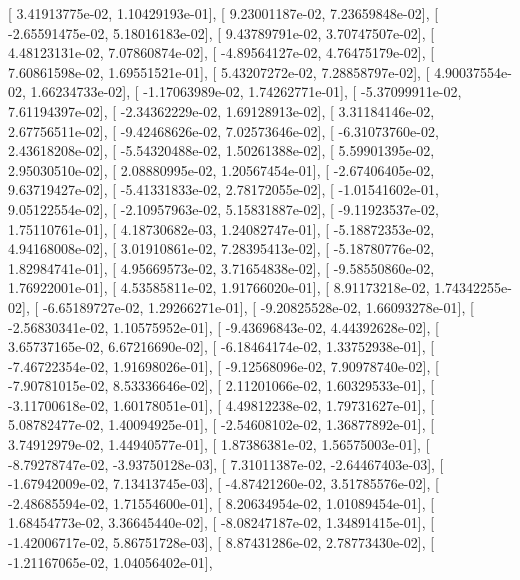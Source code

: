 \documentclass{article}
\begin{document}
       [  3.41913775e-02,   1.10429193e-01],
       [  9.23001187e-02,   7.23659848e-02],
       [ -2.65591475e-02,   5.18016183e-02],
       [  9.43789791e-02,   3.70747507e-02],
       [  4.48123131e-02,   7.07860874e-02],
       [ -4.89564127e-02,   4.76475179e-02],
       [  7.60861598e-02,   1.69551521e-01],
       [  5.43207272e-02,   7.28858797e-02],
       [  4.90037554e-02,   1.66234733e-02],
       [ -1.17063989e-02,   1.74262771e-01],
       [ -5.37099911e-02,   7.61194397e-02],
       [ -2.34362229e-02,   1.69128913e-02],
       [  3.31184146e-02,   2.67756511e-02],
       [ -9.42468626e-02,   7.02573646e-02],
       [ -6.31073760e-02,   2.43618208e-02],
       [ -5.54320488e-02,   1.50261388e-02],
       [  5.59901395e-02,   2.95030510e-02],
       [  2.08880995e-02,   1.20567454e-01],
       [ -2.67406405e-02,   9.63719427e-02],
       [ -5.41331833e-02,   2.78172055e-02],
       [ -1.01541602e-01,   9.05122554e-02],
       [ -2.10957963e-02,   5.15831887e-02],
       [ -9.11923537e-02,   1.75110761e-01],
       [  4.18730682e-03,   1.24082747e-01],
       [ -5.18872353e-02,   4.94168008e-02],
       [  3.01910861e-02,   7.28395413e-02],
       [ -5.18780776e-02,   1.82984741e-01],
       [  4.95669573e-02,   3.71654838e-02],
       [ -9.58550860e-02,   1.76922001e-01],
       [  4.53585811e-02,   1.91766020e-01],
       [  8.91173218e-02,   1.74342255e-02],
       [ -6.65189727e-02,   1.29266271e-01],
       [ -9.20825528e-02,   1.66093278e-01],
       [ -2.56830341e-02,   1.10575952e-01],
       [ -9.43696843e-02,   4.44392628e-02],
       [  3.65737165e-02,   6.67216690e-02],
       [ -6.18464174e-02,   1.33752938e-01],
       [ -7.46722354e-02,   1.91698026e-01],
       [ -9.12568096e-02,   7.90978740e-02],
       [ -7.90781015e-02,   8.53336646e-02],
       [  2.11201066e-02,   1.60329533e-01],
       [ -3.11700618e-02,   1.60178051e-01],
       [  4.49812238e-02,   1.79731627e-01],
       [  5.08782477e-02,   1.40094925e-01],
       [ -2.54608102e-02,   1.36877892e-01],
       [  3.74912979e-02,   1.44940577e-01],
       [  1.87386381e-02,   1.56575003e-01],
       [ -8.79278747e-02,  -3.93750128e-03],
       [  7.31011387e-02,  -2.64467403e-03],
       [ -1.67942009e-02,   7.13413745e-03],
       [ -4.87421260e-02,   3.51785576e-02],
       [ -2.48685594e-02,   1.71554600e-01],
       [  8.20634954e-02,   1.01089454e-01],
       [  1.68454773e-02,   3.36645440e-02],
       [ -8.08247187e-02,   1.34891415e-01],
       [ -1.42006717e-02,   5.86751728e-03],
       [  8.87431286e-02,   2.78773430e-02],
       [ -1.21167065e-02,   1.04056402e-01],
\end{document}
